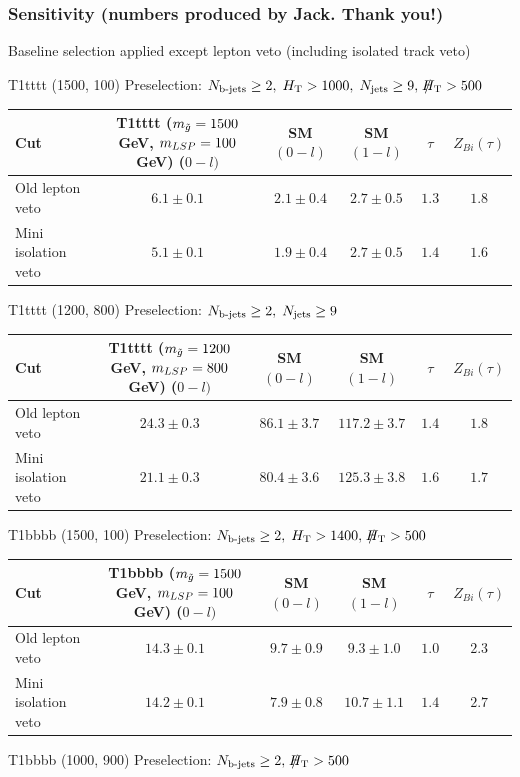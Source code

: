 \documentclass{beamer}
\begin{document}
\begin{frame}
 \frametitle{Sensitivity (numbers produced by Jack. Thank you!)}

\small Baseline selection applied except lepton veto (including isolated track veto)
 \Tiny
 \begin{center}
 \Tiny
T1tttt (1500, 100) Preselection: $N_{\text{b-jets}}\geq2,\;H_{\text{T}}>1000,\;N_{\text{jets}}\geq9,\;\slash\mkern-12mu{H}_{\text{T}}>500$

 \begin{tabular}{lc|cc|cc}
    \hline
    \hline
    Cut & T1tttt ($m_{\tilde{g}}=1500$ GeV, $m_{LSP}=100$ GeV) ($0-l)$ & SM $(0-l)$ & SM $(1-l)$ & $\tau$ & $Z_{Bi}(\tau)$ \\ \hline
Old lepton veto & $6.1 \pm 0.1$ & $2.1 \pm 0.4$ & $2.7 \pm 0.5$ &  $1.3$ & $1.8$  \\
Mini isolation veto & $5.1 \pm 0.1$ & $1.9 \pm 0.4$ & $2.7 \pm 0.5$ &  $1.4$ & $1.6$  \\
    \hline
    \hline
  \end{tabular}
  \end{center}
  
  \begin{center}
 \Tiny T1tttt (1200, 800) Preselection: $N_{\text{b-jets}}\geq2,\;N_{\text{jets}}\geq9$
 \begin{tabular}{lc|cc|cc}
    \hline
    \hline
    Cut & T1tttt ($m_{\tilde{g}}=1200$ GeV, $m_{LSP}=800$ GeV) ($0-l)$ & SM $(0-l)$ & SM $(1-l)$ & $\tau$ & $Z_{Bi}(\tau)$ \\ \hline
Old lepton veto & $24.3 \pm 0.3$ & $86.1 \pm 3.7$ & $117.2 \pm 3.7$ &  $1.4$ & $1.8$  \\
Mini isolation veto & $21.1 \pm 0.3$ & $80.4 \pm 3.6$ & $125.3 \pm 3.8$ &  $1.6$ & $1.7$  \\
    \hline
    \hline
  \end{tabular}
   \end{center}
   
  \begin{center}
 \Tiny T1bbbb (1500, 100) Preselection: $N_{\text{b-jets}}\geq2,\;H_{\text{T}}>1400,\;\slash\mkern-12mu{H}_{\text{T}}>500$

  \begin{tabular}{lc|cc|cc}
    \hline
    \hline
    Cut & T1bbbb ($m_{\tilde{g}}=1500$ GeV, $m_{LSP}=100$ GeV) ($0-l)$ & SM $(0-l)$ & SM $(1-l)$ &  $\tau$ & $Z_{Bi}(\tau)$ \\ \hline
Old lepton veto & $14.3 \pm 0.1$ & $9.7 \pm 0.9$ & $9.3 \pm 1.0$ &  $1.0$ & $2.3$  \\
Mini isolation veto & $14.2 \pm 0.1$ & $7.9 \pm 0.8$ & $10.7 \pm 1.1$ &  $1.4$ & $2.7$  \\
    \hline
    \hline
  \end{tabular}
 \end{center}
  \begin{center}
 \Tiny T1bbbb (1000, 900) Preselection: $N_{\text{b-jets}}\geq2,\;\slash\mkern-12mu{H}_{\text{T}}>500$


\end{center}
\end{frame}
\end{document}
